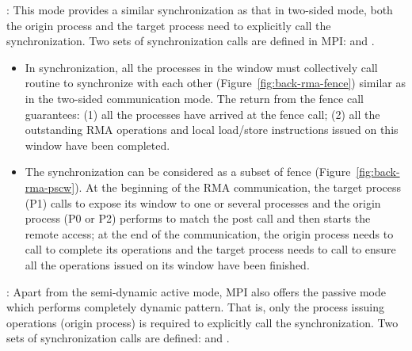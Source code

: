 :
This mode provides a similar synchronization as that in two-sided mode,
both the origin process and the target process need to explicitly
call the synchronization. Two sets of synchronization calls are defined
in MPI:  and .

\begin{itemize}
  \item In  synchronization, all the processes in the window
  must collectively call  routine to synchronize with
  each other (Figure~\ref{fig:back-rma-fence}) similar as  in the
  two-sided communication mode. The return from the fence call guarantees:
  (1) all the processes have arrived at the fence call; (2) all the outstanding
  RMA operations and local load\slash store instructions issued on this window
  have been completed.

  \item The  synchronization can be considered as
  a subset of fence (Figure~\ref{fig:back-rma-pscw}). At the beginning of
  the RMA communication, the target process (P1) calls 
  to expose its window to one or several processes and the origin process
  (P0 or P2) performs  to match the post call and then
  starts the remote access; at the end of the communication, the origin
  process needs to call  to complete its operations
  and the target process needs to call  to ensure all
  the operations issued on its window have been finished.
\end{itemize}

:
Apart from the semi-dynamic active mode, MPI also offers the passive mode
which performs completely dynamic pattern. That is, only the process
issuing operations (origin process) is required to explicitly call the
synchronization. Two sets of synchronization calls are defined:
 and .


